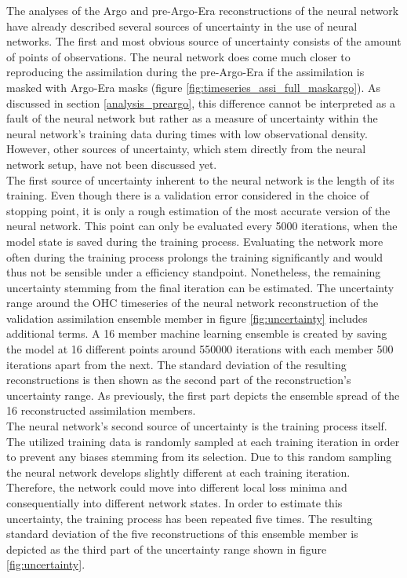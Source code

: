 \documentclass[Masterarbeit.tex]{subfile}
\begin{document}
	The analyses of the Argo and pre-Argo-Era reconstructions of the neural network have already described several sources of uncertainty in the use of neural networks. The first and most obvious source of uncertainty consists of the amount of points of observations. The neural network does come much closer to reproducing the assimilation during the pre-Argo-Era if the assimilation is masked with Argo-Era masks (figure \ref{fig:timeseries_assi_full_maskargo}). As discussed in section \ref{analysis_preargo}, this difference cannot be interpreted as a fault of the neural network but rather as a measure of uncertainty within the neural network's training data during times with low observational density. However, other sources of uncertainty, which stem directly from the neural network setup, have not been discussed yet. \\
	The first source of uncertainty inherent to the neural network is the length of its training. Even though there is a validation error considered in the choice of stopping point, it is only a rough estimation of the most accurate version of the neural network. This point can only be evaluated every 5000 iterations, when the model state is saved during the training process. Evaluating the network more often during the training process prolongs the training significantly and would thus not be sensible under a efficiency standpoint. Nonetheless, the remaining uncertainty stemming from the final iteration can be estimated. The uncertainty range around the OHC timeseries of the neural network reconstruction of the validation assimilation ensemble member in figure \ref{fig:uncertainty} includes additional terms. A 16 member machine learning ensemble is created by saving the model at 16 different points around 550000 iterations with each member 500 iterations apart from the next. The standard deviation of the resulting reconstructions is then shown as the second part of the reconstruction's uncertainty range. As previously, the first part depicts the ensemble spread of the 16 reconstructed assimilation members.\\
	The neural network's second source of uncertainty is the training process itself. The utilized training data is randomly sampled at each training iteration in order to prevent any biases stemming from its selection. Due to this random sampling the neural network develops slightly different at each training iteration. Therefore, the network could move into different local loss minima and consequentially into different network states. In order to estimate this uncertainty, the training process has been repeated five times. The resulting standard deviation of the five reconstructions of this ensemble member is depicted as the third part of the uncertainty range shown in figure \ref{fig:uncertainty}.
	
\end{document}
